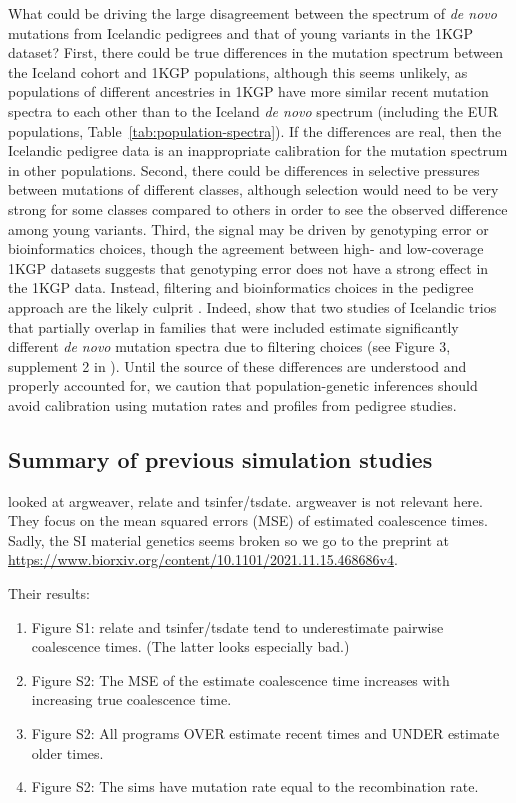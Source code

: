 \documentclass[]{article}
\begin{document}
What could be driving the large disagreement between the spectrum of \emph{de
novo} mutations from Icelandic pedigrees and that of young variants in the 1KGP
dataset? First, there could be true differences in the mutation spectrum
between the Iceland cohort and 1KGP populations, although this seems unlikely, as
populations of different ancestries in 1KGP have more similar recent mutation
spectra to each other than to the Iceland \emph{de novo} spectrum (including
the EUR populations, Table~\ref{tab:population-spectra}). If the differences
are real, then the Icelandic pedigree data is an inappropriate calibration for
the mutation spectrum in other populations. Second, there could be differences
in selective pressures between mutations of different classes, although
selection would need to be very strong for some classes compared to others in
order to see the observed difference among young variants.  Third, the signal
may be driven by genotyping error or bioinformatics choices, though the
agreement between high- and low-coverage 1KGP datasets suggests that genotyping
error does not have a strong effect in the 1KGP data. Instead, filtering and
bioinformatics choices in the pedigree approach are the likely culprit
\citep{bergeron2022mutationathon}.
Indeed, \citet{gao2023limited} show that two studies of Icelandic trios that
partially overlap in families that were included
\citep{jonsson2017parental,halldorsson2019characterizing} estimate
significantly different \emph{de novo} mutation spectra due to filtering
choices (see Figure 3, supplement 2 in \citet{gao2023limited}).
Until the source of these differences are
understood and properly accounted for, we caution that
population-genetic inferences should
avoid calibration using mutation rates and profiles from pedigree studies.

\subsection*{Summary of previous simulation studies}

\cite{brandt2022evaluation} looked at argweaver, relate and tsinfer/tsdate.
argweaver is not relevant here.
They focus on the mean squared errors (MSE) of estimated coalescence times.
Sadly, the SI material genetics seems broken so we go to the preprint at \url{https://www.biorxiv.org/content/10.1101/2021.11.15.468686v4}.

Their results:

\begin{enumerate}
    \item Figure S1: relate and tsinfer/tsdate tend to underestimate pairwise coalescence times. (The latter looks especially bad.)
    \item Figure S2: The MSE of the estimate coalescence time increases with increasing true coalescence time.
    \item Figure S2: All programs OVER estimate recent times and UNDER estimate older times.
    \item Figure S2: The sims have mutation rate equal to the recombination rate.
\end{enumerate}
\end{document}
